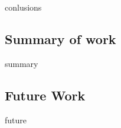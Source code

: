conlusions

\subsection{Summary of work}%
\label{sec:Res1_Summary}

summary

\subsection{Future Work}%
\label{sec:Res1_future}

future